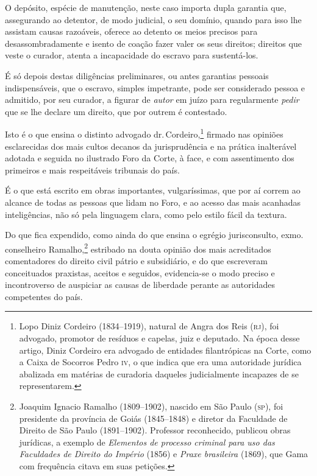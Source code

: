 O depósito, espécie de manutenção, neste caso importa dupla garantia
que, assegurando ao detentor, de modo judicial, o seu domínio, quando
para isso lhe assistam causas razoáveis, oferece ao detento os meios
precisos para desassombradamente e isento de coação fazer valer os seus
direitos; direitos que veste o curador, atenta a incapacidade do escravo
para sustentá-los.

É só depois destas diligências preliminares, ou antes garantias pessoais
indispensáveis, que o escravo, simples impetrante, pode ser considerado
pessoa e admitido, por seu curador, a figurar de \emph{autor} em juízo
para regularmente \emph{pedir} que se lhe declare um direito, que por
outrem é contestado.

Isto é o que ensina o distinto advogado dr.\,Cordeiro,\footnote{Lopo
  Diniz Cordeiro (1834--1919), natural de Angra dos Reis (\textsc{rj}), foi
  advogado, promotor de resíduos e capelas, juiz e deputado. Na época
  desse artigo, Diniz Cordeiro era advogado de entidades filantrópicas
  na Corte, como a Caixa de Socorros Pedro \textsc{iv}, o que indica que era uma
  autoridade jurídica abalizada em matérias de curadoria daqueles
  judicialmente incapazes de se representarem.} firmado nas opiniões
esclarecidas dos mais cultos decanos da jurisprudência e na prática
inalterável adotada e seguida no ilustrado Foro da Corte, à face, e com
assentimento dos primeiros e mais respeitáveis tribunais do país.

É o que está escrito em obras importantes, vulgaríssimas, que por aí
correm ao alcance de todas as pessoas que lidam no Foro, e ao acesso das
mais acanhadas inteligências, não só pela linguagem clara, como pelo
estilo fácil da textura.

Do que fica expendido, como ainda do que ensina o egrégio jurisconsulto,
exmo.\,conselheiro Ramalho,\footnote{Joaquim Ignacio Ramalho
  (1809--1902), nascido em São Paulo (\textsc{sp}), foi presidente da província de
  Goiás (1845--1848) e diretor da Faculdade de Direito de São Paulo
  (1891--1902). Professor reconhecido, publicou obras jurídicas, a
  exemplo de \emph{Elementos de processo criminal para uso das
  Faculdades de Direito do Império} (1856) e \emph{Praxe brasileira}
  (1869), que Gama com frequência citava em suas petições.} estribado
na douta opinião dos mais acreditados comentadores do direito civil
pátrio e subsidiário, e do que escreveram conceituados praxistas,
aceitos e seguidos, evidencia-se o modo preciso e incontroverso de
auspiciar as causas de liberdade perante as autoridades competentes do
país.

